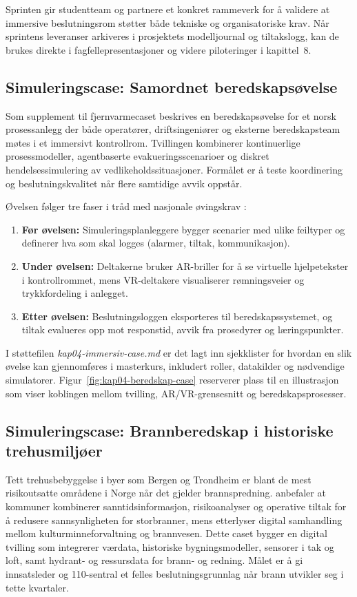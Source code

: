 Sprinten gir studentteam og partnere et konkret rammeverk for å validere at immersive beslutningsrom støtter både tekniske og organisatoriske krav. Når sprintens leveranser arkiveres i prosjektets modelljournal og tiltakslogg, kan de brukes direkte i fagfellepresentasjoner og videre piloteringer i kapittel~8.

\subsection{Simuleringscase: Samordnet beredskapsøvelse}
Som supplement til fjernvarmecaset beskrives en beredskapsøvelse for et norsk prosessanlegg der både operatører, driftsingeniører og eksterne beredskapsteam møtes i et immersivt kontrollrom. Tvillingen kombinerer kontinuerlige prosessmodeller, agentbaserte evakueringsscenarioer og diskret hendelsessimulering av vedlikeholdssituasjoner. Formålet er å teste koordinering og beslutningskvalitet når flere samtidige avvik oppstår.

Øvelsen følger tre faser i tråd med nasjonale øvingskrav \citep{dsb2023ovelser}:
\begin{enumerate}
    \item \textbf{Før øvelsen:} Simuleringsplanleggere bygger scenarier med ulike feiltyper og definerer hva som skal logges (alarmer, tiltak, kommunikasjon).
    \item \textbf{Under øvelsen:} Deltakerne bruker AR-briller for å se virtuelle hjelpetekster i kontrollrommet, mens VR-deltakere visualiserer rømningsveier og trykkfordeling i anlegget.
    \item \textbf{Etter øvelsen:} Beslutningsloggen eksporteres til beredskapssystemet, og tiltak evalueres opp mot responstid, avvik fra prosedyrer og læringspunkter.
\end{enumerate}

I støttefilen \textit{kap04-immersiv-case.md} er det lagt inn sjekklister for hvordan en slik øvelse kan gjennomføres i masterkurs, inkludert roller, datakilder og nødvendige simulatorer. Figur~\ref{fig:kap04-beredskap-case} reserverer plass til en illustrasjon som viser koblingen mellom tvilling, AR/VR-grensesnitt og beredskapsprosesser.

\subsection{Simuleringscase: Brannberedskap i historiske trehusmiljøer}
Tett trehusbebyggelse i byer som Bergen og Trondheim er blant de mest risikoutsatte områdene i Norge når det gjelder brannspredning. \citet{dsb2021trehus} anbefaler at kommuner kombinerer sanntidsinformasjon, risikoanalyser og operative tiltak for å redusere sannsynligheten for storbranner, mens \citet{riksantikvaren2020trehus} etterlyser digital samhandling mellom kulturminneforvaltning og brannvesen. Dette caset bygger en digital tvilling som integrerer værdata, historiske bygningsmodeller, sensorer i tak og loft, samt hydrant- og ressursdata for brann- og redning. Målet er å gi innsatsleder og 110-sentral et felles beslutningsgrunnlag når brann utvikler seg i tette kvartaler.


